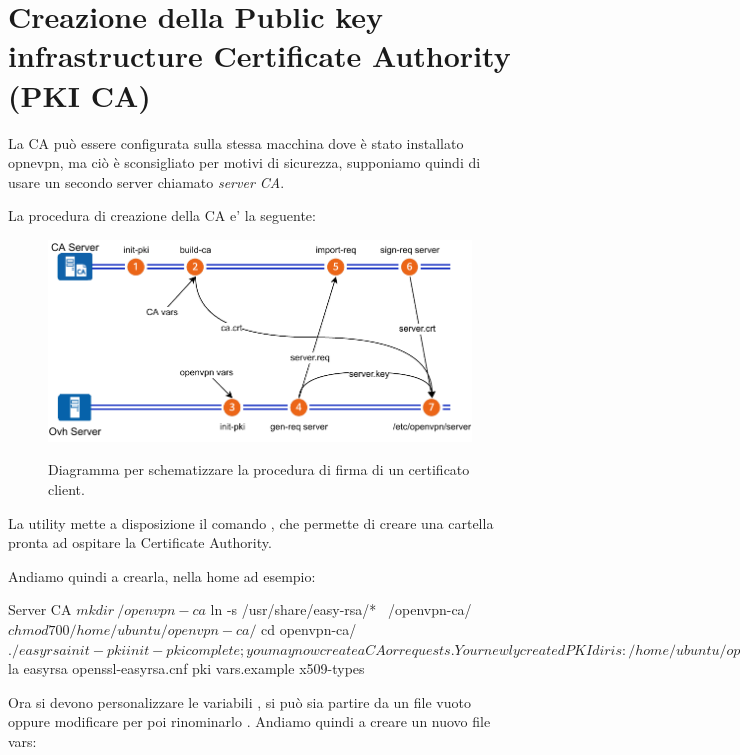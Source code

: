 \section{Creazione della Public key infrastructure Certificate Authority (PKI CA)}
\label{sec:pki_ca}

La CA può essere configurata sulla stessa macchina dove è stato installato opnevpn, ma ciò è sconsigliato per motivi di sicurezza, supponiamo quindi di usare un secondo server chiamato \textit{server CA}.

La procedura di creazione della CA e' la seguente:

\begin{figure}[H]
    \centering
    \includegraphics[width=0.9\linewidth]{immagini/diag-firma_certificato_ca}
    \label{fig:diag-firma_certificato_ca}
    \caption{Diagramma per schematizzare la procedura di firma di un certificato client. \cite{icons}}
\end{figure}


La utility  mette a disposizione il comando , che permette di creare una cartella pronta ad ospitare la Certificate Authority.

Andiamo quindi a crearla, nella home ad esempio:

\begin{bashcode}{Server CA}{}
$ mkdir ~/openvpn-ca
$ ln -s /usr/share/easy-rsa/* ~/openvpn-ca/
$ chmod 700 /home/ubuntu/openvpn-ca/
$ cd openvpn-ca/
$ ./easyrsa init-pki

init-pki complete; you may now create a CA or requests.
Your newly created PKI dir is: /home/ubuntu/openvpn-ca/pki

$ la
easyrsa  openssl-easyrsa.cnf  pki  vars.example  x509-types
\end{bashcode}

Ora si devono personalizzare le variabili , si può sia partire da un file vuoto oppure modificare  per poi rinominarlo .
Andiamo quindi a creare un nuovo file vars:


